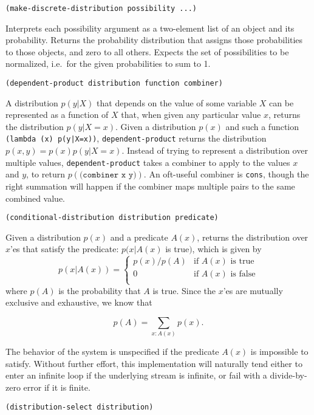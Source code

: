 \documentclass[12pt]{article}
\newcommand{\code}[1]{\texttt{#1}}
\newcommand{\startor}{\left\{ \begin{array}{ll}}
\newcommand{\stopor}{\end{array} \right.}
\begin{document}
\begin{verbatim}
(make-discrete-distribution possibility ...)
\end{verbatim}

Interprets each possibility argument as a two-element list of an object
and its probability.  Returns the probability distribution that assigns
those probabilities to those objects, and zero to all others.
Expects the set of possibilities to be normalized, i.e.\ for the 
given probabilities to sum to 1.

\begin{verbatim}
(dependent-product distribution function combiner)
\end{verbatim}

A distribution $p(y|X)$ that depends on the value of some variable
$X$ can be represented as a function of $X$ that, when given any
particular value $x$, returns the distribution $p(y|X=x)$.  Given a
distribution $p(x)$ and such a function \code{(lambda (x)
p(y|X=x))}, \code{dependent-product} returns the distribution
$p(x,y) = p(x)p(y|X=x)$.  Instead of
trying to represent a distribution over multiple values,
\code{dependent-product} takes a combiner to apply to the values $x$
and $y$, to return $p(\code{(combiner x y)})$.  An oft-useful
combiner is \code{cons}, though the right summation will happen
if the combiner maps multiple pairs to the same combined value.

\begin{verbatim}
(conditional-distribution distribution predicate)
\end{verbatim}

Given a distribution $p(x)$ and a predicate $A(x)$, returns the distribution
over $x$'es that satisfy the predicate: $p(x|A(x)$ is true$)$, which
is given by 
\[ p(x|A(x)) = \startor
p(x) / p(A) &    \textrm{if $A(x)$ is true} \\
0 &              \textrm{if $A(x)$ is false} \\
\stopor \]
where $p(A)$ is the probability that $A$ is true.  Since the $x$'es are
mutually exclusive and exhaustive, we know that

\[ p(A) = \sum_{x:A(x)} p(x). \]

The behavior of the system is unspecified if the predicate $A(x)$ is
impossible to satisfy.  Without further effort, this implementation
will naturally tend either to enter an infinite loop if the underlying
stream is infinite, or fail with a divide-by-zero error if it is
finite.

\begin{verbatim}
(distribution-select distribution)
\end{verbatim}
\end{document}
